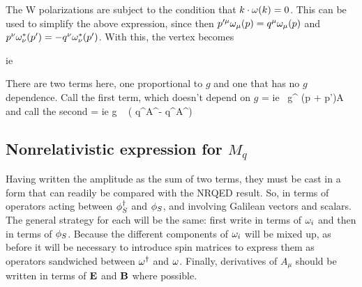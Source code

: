 The W polarizations are subject to the condition that $ k \cdot \omega(k) = 0 $.  This can be used to simplify the above expression, since then $p'^\mu \omega_{\mu}(p) = q^\mu \omega_{\mu}(p)$ and $p^\nu \omega^*_{\nu}(p') = -q^\nu \omega^*_{\nu}(p')$.  With this,  the vertex becomes

\beq
	ie\ \omin{\mu} \omout{\nu}  	
\eeq

There are two terms here, one proportional to $g$ and one that has no $g$ dependence.  Call the first term, which doesn't depend on $g$
\beq
	\Mq = ie\ \omin{\mu} \omout{\nu} g^{\mu\nu} (p + p')\cdot A 
\eeq
and call the second 
\beq
	\Mg = ie g  \ \omin{\mu} \omout{\nu}  ( q^\nu A^\mu - q^\mu A^\nu ) 	
\eeq


\subsection{Nonrelativistic expression for $M_q$}

Having written the amplitude as the sum of two terms, they must be cast in a form that can readily be compared with the NRQED result.  So, in terms of operators acting between $\phi_S^\dagger$ and $\phi_S$, and involving Galilean vectors and scalars.  The general strategy for each will be the same: first write in terms of $\omega_i$ and then in terms of $\phi_S$.  Because the different components of $\omega_i$ will be mixed up, as before it will be necessary to introduce spin matrices to express them as operators sandwiched between $\omega^\dagger$ and $\omega$.  Finally, derivatives of $A_\mu$ should be written in terms of $\mathbf{E}$ and $\mathbf{B}$ where possible.



